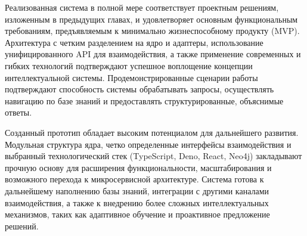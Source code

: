 Реализованная система в полной мере соответствует проектным решениям, изложенным в предыдущих главах, и удовлетворяет основным функциональным требованиям, предъявляемым к минимально жизнеспособному продукту (MVP). Архитектура с четким разделением на ядро и адаптеры, использование унифицированного API для взаимодействия, а также применение современных и гибких технологий подтверждают успешное воплощение концепции интеллектуальной системы. Продемонстрированные сценарии работы подтверждают способность системы обрабатывать запросы, осуществлять навигацию по базе знаний и предоставлять структурированные, объяснимые ответы.

Созданный прототип обладает высоким потенциалом для дальнейшего развития. Модульная структура ядра, четко определенные интерфейсы взаимодействия и выбранный технологический стек (TypeScript, Deno, React, Neo4j) закладывают прочную основу для расширения функциональности, масштабирования и возможного перехода к микросервисной архитектуре. Система готова к дальнейшему наполнению базы знаний, интеграции с другими каналами взаимодействия, а также к внедрению более сложных интеллектуальных механизмов, таких как адаптивное обучение и проактивное предложение решений.